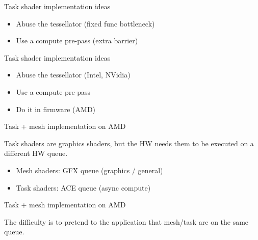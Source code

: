 \documentclass[aspectratio=169,t,xcolor=table]{beamer}
\begin{document}
\begin{frame}{Task shader implementation ideas}

    \LARGE

    \begin{itemize}
      	\item Abuse the tessellator (fixed func bottleneck)
      	\item Use a compute pre-pass (extra barrier)
    \end{itemize}

\end{frame}

\begin{frame}{Task shader implementation ideas}

    \LARGE

    \begin{itemize}
      	\item Abuse the tessellator (Intel, NVidia)
      	\item Use a compute pre-pass
      	\item Do it in firmware (AMD)
    \end{itemize}

\end{frame}

\begin{frame}{Task + mesh implementation on AMD}

    \LARGE
    Task shaders are graphics shaders, but the HW needs them
    to be executed on a different HW queue.

    \begin{itemize}
      	\item Mesh shaders: GFX queue (graphics / general)
      	\item Task shaders: ACE queue (async compute)
    \end{itemize}

\end{frame}

\begin{frame}{Task + mesh implementation on AMD}

    \LARGE
    The difficulty is to pretend to the application that mesh/task are on the same queue.

\end{frame}
\end{document}
